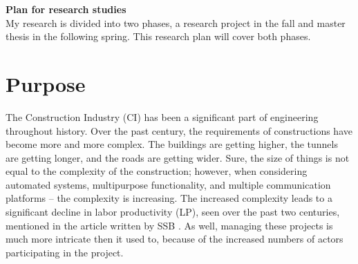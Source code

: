 {\bf \Huge Plan for research studies} \\[0.5cm]
My research is divided into two phases, a research project in the fall and master thesis in the following spring. This research plan will cover both phases.
\section*{Purpose}


The Construction Industry (CI) has been a significant part of engineering throughout history. Over the past century, the requirements of constructions have become more and more complex. The buildings are getting higher, the tunnels are getting longer, and the roads are getting wider. Sure, the size of things is not equal to the complexity of the construction; however, when considering automated systems, multipurpose functionality, and multiple communication platforms – the complexity is increasing. The increased complexity leads to a significant decline in labor productivity (LP), seen over the past two centuries, mentioned in the article written by SSB \cite{productivity}. As well, managing these projects is much more intricate then it used to, because of the increased numbers of actors participating in the project. 

